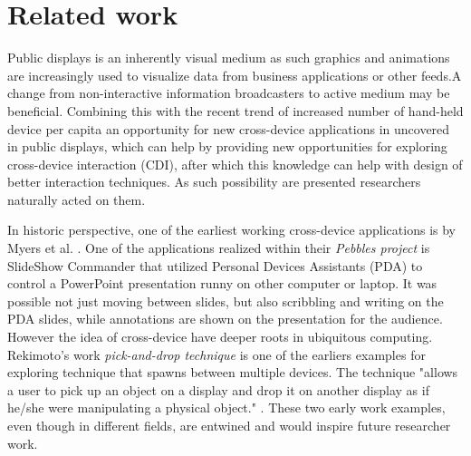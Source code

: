 \section{Related work} \label{sec:relatedwork}

Public displays is an inherently visual medium as such graphics and animations are increasingly used to visualize data from business applications or other feeds.A change from non-interactive information broadcasters to active medium may be beneficial. 
Combining this with the recent trend of increased number of hand-held device per capita an opportunity for new cross-device applications in uncovered in public displays, which can help by providing new opportunities for exploring cross-device interaction (CDI), after which this knowledge can help with design of better interaction techniques.
As such possibility are presented researchers naturally acted on them.

In historic perspective, one of the earliest working cross-device applications is by Myers et al. \cite{Myers:2001}. 
One of the applications realized within their \emph{Pebbles project} is SlideShow Commander that utilized Personal Devices Assistants (PDA) to control a PowerPoint presentation runny on other computer or laptop.
It was possible not just moving between slides, but also scribbling and writing on the PDA slides, while annotations are shown on the presentation for the audience. 
However the idea of cross-device have deeper roots in ubiquitous computing. Rekimoto's work \emph{pick-and-drop technique} is one of the earliers examples for exploring technique that spawns between multiple devices. The technique "allows a user to pick up an object on a display and drop it on another display as if he/she were manipulating a physical object." \cite{Rekimoto:1997}. 
These two early work examples, even though in different fields, are entwined and would inspire future researcher work.\\

